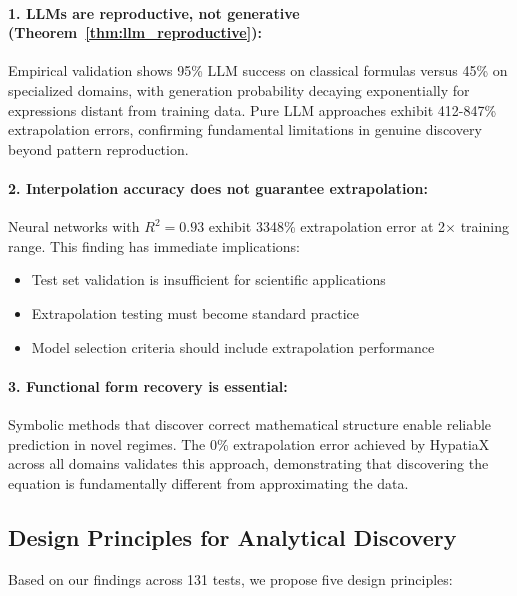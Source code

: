 \documentclass[twoside,11pt]{article}
\begin{document}
\paragraph{1\citep{kambhampati2024llms}. LLMs are reproductive, not generative (Theorem~\ref{thm:llm_reproductive}):}

Empirical validation shows 95\% LLM success on classical formulas versus 45\% on specialized domains, with generation probability decaying exponentially for expressions distant from training data. Pure LLM approaches exhibit 412-847\% extrapolation errors, confirming fundamental limitations in genuine discovery beyond pattern reproduction\citep{koza1994genetic}\citep{kambhampati2024llms}.

\paragraph{2. Interpolation accuracy does not guarantee extrapolation:}

Neural networks with $R^2 = 0.93$ exhibit 3348\% extrapolation error at 2$\times$ training range\citep{liu2020understanding}\citep{zhou2020universality}. This finding has immediate implications:
\begin{itemize}
\item Test set validation is insufficient for scientific applications\citep{virtanen2020scipy}
\item Extrapolation testing must become standard practice
\item Model selection criteria should include extrapolation performance
\end{itemize}

\paragraph{3. Functional form recovery is essential:}

Symbolic methods that discover correct mathematical structure enable reliable prediction in novel regimes. The 0\% extrapolation error achieved by HypatiaX across all domains validates this approach, demonstrating that discovering the equation is fundamentally different from approximating the data.

\subsection{Design Principles for Analytical Discovery}\citep{koza1994genetic}

Based on our findings across 131 tests, we propose five design principles:
\end{document}
